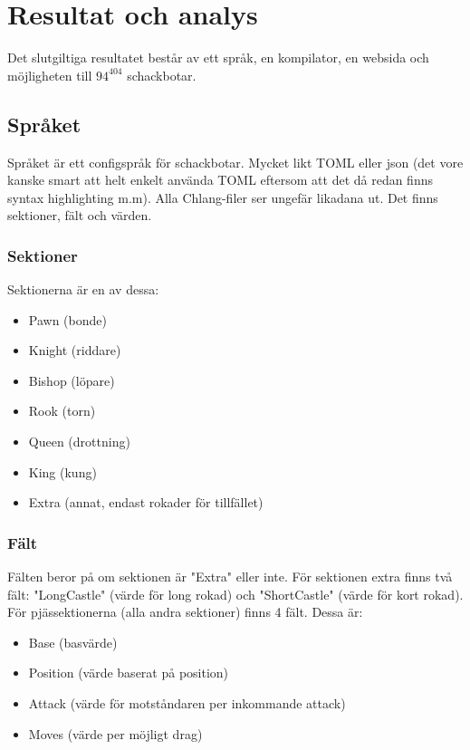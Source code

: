 \documentclass{article}
\begin{document}
	\newpage
	\section{Resultat och analys}
	Det slutgiltiga resultatet består av ett språk, en kompilator, en websida och möjligheten till ${94^{404}}$ schackbotar.

	\subsection{Språket}
	Språket är ett configspråk för schackbotar. Mycket likt TOML eller json (det vore kanske smart att helt enkelt använda TOML eftersom att det då redan finns syntax highlighting m.m). Alla Chlang-filer ser ungefär likadana ut. Det finns sektioner, fält och värden.

	\subsubsection{Sektioner}
	Sektionerna är en av dessa:
	\begin{itemize}
	\item Pawn (bonde)
	\item Knight (riddare)
	\item Bishop (löpare)
	\item Rook (torn)
	\item Queen (drottning)
	\item King (kung)
	\item Extra (annat, endast rokader för tillfället)
	\end{itemize} 

	\subsubsection{Fält}
	Fälten beror på om sektionen är "Extra" eller inte.
	För sektionen extra finns två fält: "LongCastle" (värde för long rokad) och "ShortCastle" (värde för kort rokad). För pjässektionerna (alla andra sektioner) finns 4 fält. Dessa är:
\begin{itemize}
\item Base (basvärde)
\item Position (värde baserat på position)
\item Attack (värde för motståndaren per inkommande attack)
\item Moves (värde per möjligt drag)
\end{itemize}
\end{document}
